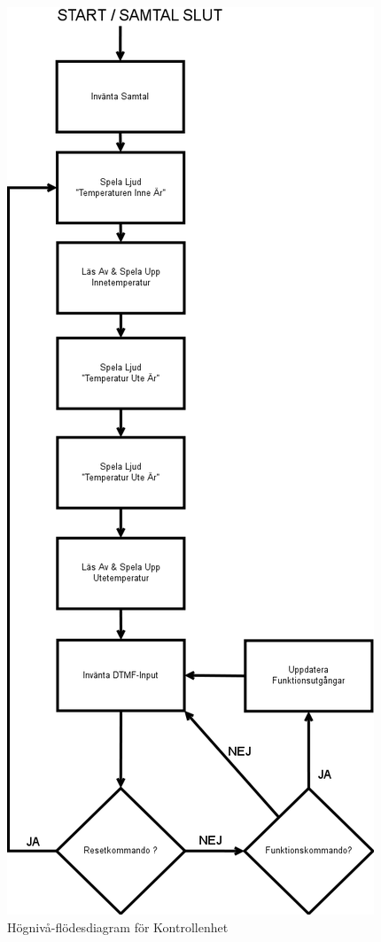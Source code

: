 \documentclass[a4paper,11pt]{article}
\begin{document}
		\begin{figure}[ht!tb]
		  \centering
		      \includegraphics[scale=0.5, angle=0]{ControlUnitFlowChart.png}
		  	\caption{Högnivå-flödesdiagram för Kontrollenhet}
			\label{fig:CUFlowChart}
		\end{figure}
\end{document}

